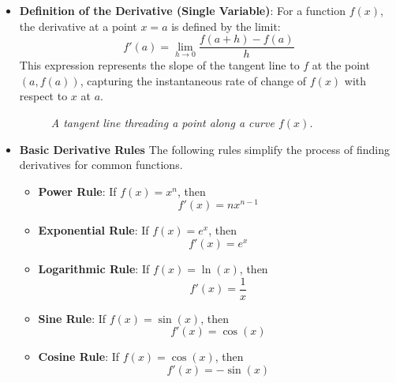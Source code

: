 \begin{itemize}
\item \textbf{Definition of the Derivative (Single Variable)}:
For a function \( f(x) \), the derivative at a point \( x = a \) is defined by the limit:
\[
f'(a) = \lim_{h \to 0} \frac{f(a + h) - f(a)}{h}
\]
This expression represents the slope of the tangent line to \( f \) at the point \( (a, f(a)) \), capturing the instantaneous rate of change of \( f(x) \) with respect to \( x \) at \( a \).


\begin{figure}[H]
\begin{center}
\caption{\textit{A tangent line threading a point along a curve \(f(x)\).}}
\end{center}
\end{figure}


\item \textbf{Basic Derivative Rules}
The following rules simplify the process of finding derivatives for common functions.

\begin{itemize}
\item \textbf{Power Rule}: If \( f(x) = x^n \), then
\[
f'(x) = nx^{n-1}
\]
\item \textbf{Exponential Rule}: If \( f(x) = e^x \), then
\[
f'(x) = e^x
\]
\item \textbf{Logarithmic Rule}: If \( f(x) = \ln(x) \), then
\[
f'(x) = \frac{1}{x}
\]
\item \textbf{Sine Rule}: If \( f(x) = \sin(x) \), then
\[
f'(x) = \cos(x)
\]
\item \textbf{Cosine Rule}: If \( f(x) = \cos(x) \), then
\[
f'(x) = -\sin(x)
\]
\end{itemize}


\end{itemize}
